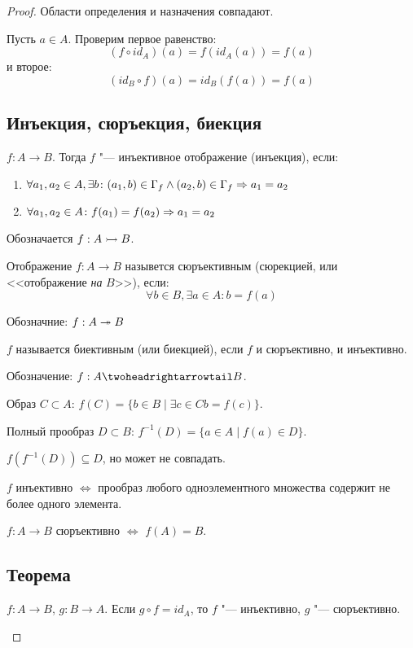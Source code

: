 \begin{proof}

Области определения и назначения совпадают.

Пусть $a \in A$. Проверим первое равенство:
\[(f \circ id_A)(a) = f(id_A(a)) = f(a)\]
и второе:
\[(id_B \circ f)(a) = id_B(f(a)) = f(a)\]

\subsection{Инъекция, сюръекция, биекция}
\begin{Def}
$f: A \to B$. Тогда $f$ "--- инъективное отображение (инъекция), если:

\begin{enumerate}
\item $\forall a_1, a_2 \in A, \exists b\colon (a_1, b) \in \Gamma_f \wedge (a_2, b) \in \Gamma_f \Rightarrow a_1 = a_2$
\item $\forall a_1, a_2 \in A\colon f(a_1) = f(a_2) \Rightarrow a_1 = a_2$
\end{enumerate}

Обозначается $f: A \rightarrowtail B$.
\end{Def}

\begin{Def}
Отображение $f: A \to B$ назывется сюръективным (сюрекцией, или <<отображение \textit{на} $B$>>), если:
\[\forall b \in B, \exists a \in A\colon b = f(a)\]

Обозначние: $f: A \twoheadrightarrow B$
\end{Def}

\begin{Def}
$f$ называется биективным (или биекцией), если $f$ и сюръективно, и инъективно.

Обозначение: $f: A \thrat B$.
\end{Def}

\begin{Def} 
Образ $C \subset A$: $f(C) = \{b \in B \mid \exists c \in C b = f(c)\}$.

Полный прообраз $D \subset B$: $f^{-1}(D) = \{a \in A \mid f(a) \in D\}$.
\end{Def}

$f(f^{-1}(D)) \subseteq D$, но может не совпадать.

$f$ инъективно $\iff$ прообраз любого одноэлементного множества содержит не более одного элемента.

$f : A \to B$ сюръективно $\iff$ $f(A) = B$.

\subsection{Теорема}
\begin{theorem}{}
$f:A \to B$, $g:B \to A$. Если $g \circ f = id_A$, то $f$ "--- инъективно, $g$ "--- сюръективно.
\end{theorem}


\end{proof}
